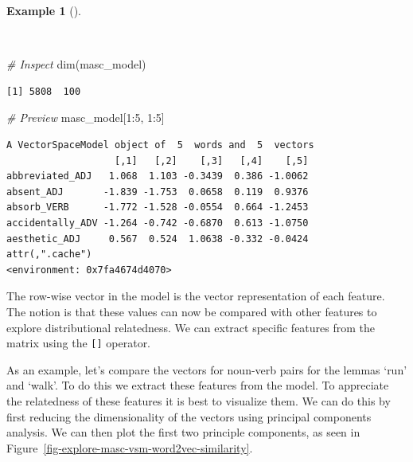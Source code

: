 \documentclass[
  letterpaper,
]{book}
\newenvironment{Shaded}{\begin{snugshade}}{\end{snugshade}}
\newcommand{\CommentTok}[1]{\textcolor[rgb]{0.00,0.00,0.00}{\textit{#1}}}
\newcommand{\DecValTok}[1]{\textcolor[rgb]{0.00,0.00,0.00}{#1}}
\newcommand{\FunctionTok}[1]{\textcolor[rgb]{0.00,0.00,0.00}{#1}}
\newcommand{\NormalTok}[1]{\textcolor[rgb]{0.00,0.00,0.00}{#1}}
\newcommand{\SpecialCharTok}[1]{\textcolor[rgb]{0.00,0.00,0.00}{#1}}
\theoremstyle{definition}
\newtheorem{example}{Example}[chapter]
\theoremstyle{remark}
\begin{document}
\begin{example}[]\protect\hypertarget{exm-explore-masc-vsm-word2vec-vector-object}{}\label{exm-explore-masc-vsm-word2vec-vector-object}

~

\begin{Shaded}
\begin{Highlighting}[]
\CommentTok{\# Inspect}
\FunctionTok{dim}\NormalTok{(masc\_model)}
\end{Highlighting}
\end{Shaded}

\begin{verbatim}
[1] 5808  100
\end{verbatim}

\begin{Shaded}
\begin{Highlighting}[]
\CommentTok{\# Preview}
\NormalTok{masc\_model[}\DecValTok{1}\SpecialCharTok{:}\DecValTok{5}\NormalTok{, }\DecValTok{1}\SpecialCharTok{:}\DecValTok{5}\NormalTok{]}
\end{Highlighting}
\end{Shaded}

\begin{verbatim}
A VectorSpaceModel object of  5  words and  5  vectors
                   [,1]   [,2]    [,3]   [,4]    [,5]
abbreviated_ADJ   1.068  1.103 -0.3439  0.386 -1.0062
absent_ADJ       -1.839 -1.753  0.0658  0.119  0.9376
absorb_VERB      -1.772 -1.528 -0.0554  0.664 -1.2453
accidentally_ADV -1.264 -0.742 -0.6870  0.613 -1.0750
aesthetic_ADJ     0.567  0.524  1.0638 -0.332 -0.0424
attr(,".cache")
<environment: 0x7fa4674d4070>
\end{verbatim}

\end{example}

The row-wise vector in the model is the vector representation of each
feature. The notion is that these values can now be compared with other
features to explore distributional relatedness. We can extract specific
features from the matrix using the \texttt{{[}{]}} operator.

As an example, let's compare the vectors for noun-verb pairs for the
lemmas `run' and `walk'. To do this we extract these features from the
model. To appreciate the relatedness of these features it is best to
visualize them. We can do this by first reducing the dimensionality of
the vectors using principal components analysis. We can then plot the
first two principle components, as seen in
Figure~\ref{fig-explore-masc-vsm-word2vec-similarity}.
\end{document}
